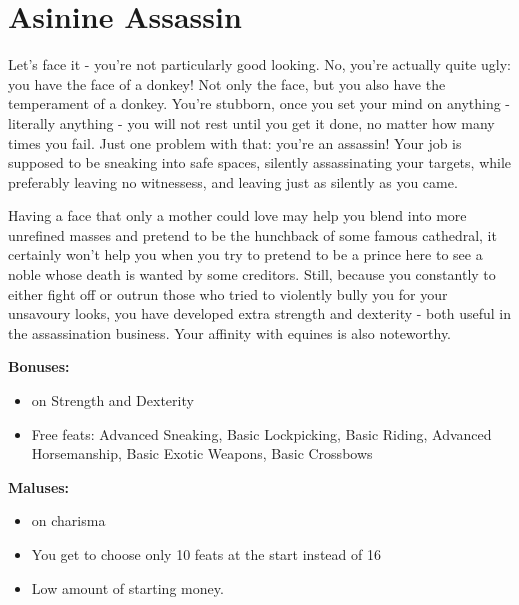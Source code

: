 \section{Asinine Assassin}
Let's face it - you're not particularly good looking. No, you're actually quite ugly: you have the face of a donkey! Not only the face, but you also have the temperament of a donkey. You're stubborn, once you set your mind on anything - literally anything - you will not rest until you get it done, no matter how many times you fail. Just one problem with that: you're an assassin! Your job is supposed to be sneaking into safe spaces, silently assassinating your targets, while preferably leaving no witnessess, and leaving just as silently as you came.

Having a face that only a mother could love may help you blend into more unrefined masses and pretend to be the hunchback of some famous cathedral, it certainly won't help you when you try to pretend to be a prince here to see a noble whose death is wanted by some creditors. Still, because you constantly to either fight off or outrun those who tried to violently bully you for your unsavoury looks, you have developed extra strength and dexterity - both useful in the assassination business. Your affinity with equines is also noteworthy.


\textbf{Bonuses:}
\begin{itemize}
	\item {} on Strength and Dexterity
	\item Free feats: Advanced Sneaking, Basic Lockpicking, Basic Riding, Advanced Horsemanship, Basic Exotic Weapons, Basic Crossbows
\end{itemize}


\textbf{Maluses:}
\begin{itemize}
	\item {} on charisma
	\item You get to choose only 10 feats at the start instead of 16
	\item Low amount of starting money.
\end{itemize}

